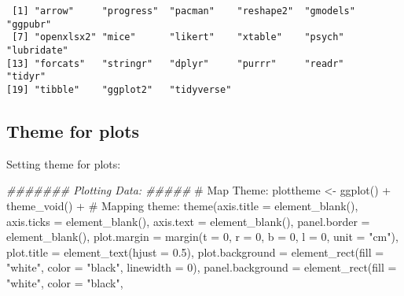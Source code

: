 \documentclass[
  letterpaper,
  DIV=11,
  numbers=noendperiod]{scrartcl}
\newenvironment{Shaded}{\begin{snugshade}}{\end{snugshade}}
\newcommand{\AttributeTok}[1]{\textcolor[rgb]{0.40,0.45,0.13}{#1}}
\newcommand{\CommentTok}[1]{\textcolor[rgb]{0.37,0.37,0.37}{#1}}
\newcommand{\DecValTok}[1]{\textcolor[rgb]{0.68,0.00,0.00}{#1}}
\newcommand{\DocumentationTok}[1]{\textcolor[rgb]{0.37,0.37,0.37}{\textit{#1}}}
\newcommand{\FloatTok}[1]{\textcolor[rgb]{0.68,0.00,0.00}{#1}}
\newcommand{\FunctionTok}[1]{\textcolor[rgb]{0.28,0.35,0.67}{#1}}
\newcommand{\NormalTok}[1]{\textcolor[rgb]{0.00,0.23,0.31}{#1}}
\newcommand{\OtherTok}[1]{\textcolor[rgb]{0.00,0.23,0.31}{#1}}
\newcommand{\SpecialCharTok}[1]{\textcolor[rgb]{0.37,0.37,0.37}{#1}}
\newcommand{\StringTok}[1]{\textcolor[rgb]{0.13,0.47,0.30}{#1}}
\begin{document}
\begin{verbatim}
 [1] "arrow"     "progress"  "pacman"    "reshape2"  "gmodels"   "ggpubr"   
 [7] "openxlsx2" "mice"      "likert"    "xtable"    "psych"     "lubridate"
[13] "forcats"   "stringr"   "dplyr"     "purrr"     "readr"     "tidyr"    
[19] "tibble"    "ggplot2"   "tidyverse"
\end{verbatim}

\subsection{Theme for plots}\label{theme-for-plots}

Setting theme for plots:

\begin{Shaded}
\begin{Highlighting}[]
\DocumentationTok{\#\#\#\#\#\#\# Plotting Data: \#\#\#\#\#}
\CommentTok{\# Map Theme:}
\NormalTok{plottheme }\OtherTok{\textless{}{-}} \FunctionTok{ggplot}\NormalTok{() }\SpecialCharTok{+}
  \FunctionTok{theme\_void}\NormalTok{() }\SpecialCharTok{+}
  \CommentTok{\# Mapping theme:}
  \FunctionTok{theme}\NormalTok{(}\AttributeTok{axis.title =} \FunctionTok{element\_blank}\NormalTok{(),}
        \AttributeTok{axis.ticks =} \FunctionTok{element\_blank}\NormalTok{(),}
        \AttributeTok{axis.text =} \FunctionTok{element\_blank}\NormalTok{(),}
        \AttributeTok{panel.border =} \FunctionTok{element\_blank}\NormalTok{(),}
        \AttributeTok{plot.margin =} \FunctionTok{margin}\NormalTok{(}\AttributeTok{t =} \DecValTok{0}\NormalTok{, }
                             \AttributeTok{r =} \DecValTok{0}\NormalTok{, }
                             \AttributeTok{b =} \DecValTok{0}\NormalTok{, }
                             \AttributeTok{l =} \DecValTok{0}\NormalTok{, }
                             \AttributeTok{unit =} \StringTok{"cm"}\NormalTok{),}
        \AttributeTok{plot.title =} \FunctionTok{element\_text}\NormalTok{(}\AttributeTok{hjust =} \FloatTok{0.5}\NormalTok{),}
        \AttributeTok{plot.background =} \FunctionTok{element\_rect}\NormalTok{(}\AttributeTok{fill =} \StringTok{"white"}\NormalTok{, }
                                       \AttributeTok{color =} \StringTok{"black"}\NormalTok{,}
                                       \AttributeTok{linewidth =} \DecValTok{0}\NormalTok{),}
        \AttributeTok{panel.background =} \FunctionTok{element\_rect}\NormalTok{(}\AttributeTok{fill =} \StringTok{"white"}\NormalTok{, }
                                        \AttributeTok{color =} \StringTok{"black"}\NormalTok{,}

\end{Highlighting}
\end{Shaded}
\end{document}
